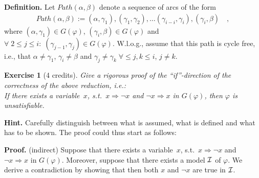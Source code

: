 \documentclass [11pt]{article}
\newtheorem{exercise}{Exercise}
\newcommand{\Ra}{\Rightarrow}
\renewcommand{\phi}{\varphi}
\def\a{\alpha}
\def\b{\beta}
\def\g{\gamma}
\renewcommand{\em}{\rm}
\begin{document}
\medskip

\noindent
\textbf{Definition.} Let $Path(\a,\b)$ denote a sequence of arcs of the form 
\begin{align}
Path(\a,\b) := (\a, \g_1),(\g_1,\g_2),\dots(\g_{i-i},\g_i),(\g_i,\b) \quad ,
\end{align}
where $(\a,\g_1) \in G(\phi)$, $(\g_i,\b) \in G(\phi)$ and $\forall\; 2 \leq j \leq i:\;(\g_{j-1}, \g_j) \in G(\phi)$. W.l.o.g., assume that this path is cycle free, i.e., that $\a\neq \g_1$, $\g_i \neq\b$ and $\g_j \neq \g_k\;\forall \leq j, k \leq i$, $j\neq k$.

\medskip

\begin{exercise}[4 credits]\label{ex1}
{\em Give a rigorous proof of the 
``if''-direction of the correctness of the above reduction, i.e.: \\
%
If there exists a variable~$x$, s.t.\
$x \Ra  \neg x$ and $\neg x \Ra x$ in
$G(\phi)$, then $\phi$ is unsatisfiable.
}%
\end{exercise}


\noindent
{\bf Hint.} Carefully distinguish between what is assumed, what is defined and what has to be shown. The proof could thus start as follows: 

\medskip
\noindent
{\bf Proof.} (indirect) 
Suppose that there exists a variable~$x$, s.t.\
$x \Ra  \neg x$ and $\neg x \Ra x$ in
$G(\phi)$. Moreover, suppose that there exists a model ${\cal I}$ of $\phi$. We derive a contradiction by showing that 
then both $x$ and $\neg x$ are true in ${\cal I}$.
\end{document}
